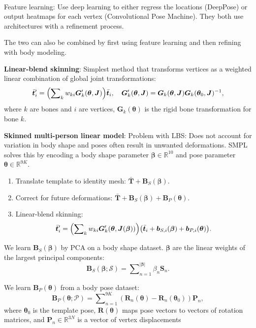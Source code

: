 \documentclass{article}
\newcommand{\lft}{\mathopen{}\mathclose\bgroup\left}
\newcommand{\rgt}{\aftergroup\egroup\right}
\newcommand{\R}{\mathbb{R}}
\renewcommand{\vec}[1]{\bm{#1}}
\newcommand{\mat}[1]{\bm{#1}}
\newenvironment{topic}[1]
{\textbf{\sffamily \colorbox{black}{\rlap{\textbf{\textcolor{white}{#1}}}\hspace{\linewidth}\hspace{-2\fboxsep}}} \\ \vspace{0.2cm}}
{}
\begin{document}
\begin{multicols*}{2}
\begin{topic}{Parametric human body models}
        Feature learning: Use deep learning to either regress the locations (DeepPose) or output heatmaps
        for each vertex (Convolutional Pose Machine). They both use architectures with a refinement
        process.

        The two can also be combined by first using feature learning and then refining with body modeling.

        \textbf{Linear-blend skinning}: Simplest method that transforms vertices as a weighted linear combination of global joint transformations: \[
            \bar{\vec{t}}_i' = \lft( \sum\nolimits_{k} w_{ki} \mat{G}'_k(\vec{\theta}, \mat{J}) \rgt) \bar{\vec{t}}_i, \quad \mat{G}'_k(\vec{\theta}, \mat{J}) = \mat{G}_k(\vec{\theta}, \mat{J}) \mat{G}_k(\vec{\theta}_0, \mat{J})^{-1},
        \]
        where $k$ are bones and $i$ are vertices, $\mat{G}_k(\vec{\theta})$ is the rigid bone
        transformation for bone $k$. %

        \textbf{Skinned multi-person linear model}: Problem with LBS: Does not account for variation
        in body shape and poses often result in unwanted deformations. SMPL solves this by encoding a
        body shape parameter $\vec{\beta} \in \R^{10}$ and pose parameter $\vec{\theta} \in \R^{9K}$.

        \begin{enumerate}
            \item Translate template to identity mesh: $\bar{\mat{T}} + \mat{B}_S(\vec{\beta})$.
            \item Correct for future deformations: $\bar{\mat{T}} + \mat{B}_S(\vec{\beta}) +
                      \mat{B}_P(\vec{\theta})$.
            \item Linear-blend skinning: \[
                      \bar{\vec{t}}_i' = \lft( \sum\nolimits_{k} w_{ki} \mat{G}'_k(\vec{\theta}, \mat{J}(\vec{\beta})) \rgt) \lft(\bar{\vec{t}}_i + \vec{b}_{S,i}(\vec{\beta}) + \vec{b}_{P,i}(\vec{\theta})\rgt).
                  \]
        \end{enumerate}

        We learn $\mat{B}_S(\vec{\beta})$ by PCA on a body shape dataset. $\vec{\beta}$ are the linear
        weights of the largest principal components: \[
            \mat{B}_S(\vec{\beta}; \mathcal{S}) = \sum\nolimits_{n=1}^{|\vec{\beta}|} \beta_n \mat{S}_n.
        \]

        We learn $\mat{B}_P(\vec{\theta})$ from a body pose dataset: \[
            \mat{B}_P(\vec{\theta}; \mathcal{P}) = \sum\nolimits_{n=1}^{9K} (\mat{R}_n(\vec{\theta}) - \mat{R}_n(\vec{\theta}_0)) \mat{P}_n,
        \]
        where $\vec{\theta}_0$ is the template pose, $\mat{R}(\vec{\theta})$ maps pose vectors to vectors
        of rotation matrices, and $\mat{P}_n \in \R^{3N}$ is a vector of vertex displacements


\end{topic}
\end{multicols*}
\end{document}
